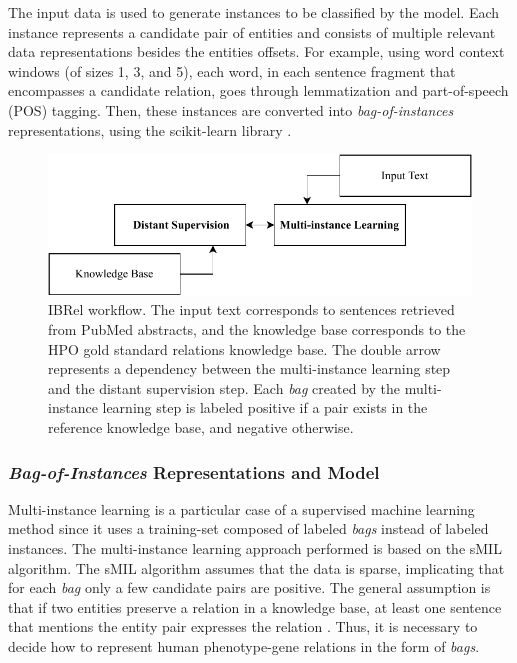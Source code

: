 The input data is used to generate instances to be classified by the model. Each instance represents a candidate pair of entities and consists of multiple relevant data representations besides the entities offsets. For example, using word context windows (of sizes 1, 3, and 5), each word, in each sentence fragment that encompasses a candidate relation, goes through lemmatization and part-of-speech (POS) tagging. Then, these instances are converted into \textit{bag-of-instances} representations, using the scikit-learn library \citep{scikit-learn}.

\begin{figure}[ht]
\captionsetup{font=small}
\centering
\includegraphics[width=13cm]{images/ibrel_workflow.pdf}
\fontsize{9}{10.8}\caption[IBRel Workflow]{IBRel workflow. The input text corresponds to sentences retrieved from PubMed abstracts, and the knowledge base corresponds to the HPO gold standard relations knowledge base. The double arrow represents a dependency between the multi-instance learning step and the distant supervision step. Each \textit{bag} created by the multi-instance learning step is labeled positive if a pair exists in the reference knowledge base, and negative otherwise.}
\label{figure:ibrel_workflow}
\end{figure}


\subsubsection{\textit{Bag-of-Instances} Representations and Model}

Multi-instance learning is a particular case of a supervised machine learning method since it uses a training-set composed of labeled \textit{bags} instead of labeled instances. The multi-instance learning approach performed is based on the sMIL algorithm. The sMIL algorithm assumes that the data is sparse, implicating that for each \textit{bag} only a few candidate pairs are positive. The general assumption is that if two entities preserve a relation in a knowledge base, at least one sentence that mentions the entity pair expresses the relation \citep{Surdeanu:2012:MML:2390948.2391003}. Thus, it is necessary to decide how to represent human phenotype-gene relations in the form of \textit{bags}. 


